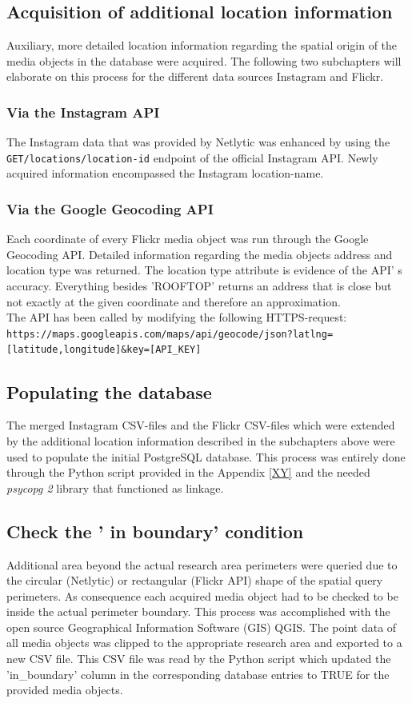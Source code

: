 \subsection{Acquisition of additional location information} \label{add_location_data}
Auxiliary, more detailed location information regarding the spatial origin of the media objects in the database were acquired. The following two subchapters will elaborate on this process for the different data sources Instagram and Flickr.

\subsubsection{Via the Instagram API}
The Instagram data that was provided by Netlytic was enhanced by using the \texttt{GET/locations/location-id} endpoint of the official Instagram API. Newly acquired information encompassed the Instagram location-name.

\subsubsection{Via the Google Geocoding API}
Each coordinate of every Flickr media object was run through the Google Geocoding API. Detailed information regarding the media objects address and location type was returned. The location type attribute is evidence of the API' s accuracy. Everything besides 'ROOFTOP' returns an address that is close but not exactly at the given coordinate and therefore an approximation.\\
The API has been called by modifying the following HTTPS-request:\\
\texttt{https://maps.googleapis.com/maps/api/geocode/json?latlng=[latitude,longitude]&key=[API\_KEY]}

\subsection{Populating the database} \label{populate_db}
The merged Instagram CSV-files and the Flickr CSV-files which were extended by the additional location information described in the subchapters above were used to populate the initial PostgreSQL database. This process was entirely done through the Python script provided in the Appendix \ref{XY} and the needed \textit{psycopg 2} library that functioned as linkage.

\subsection{Check the ' in boundary' condition} \label{in_boundary}
Additional area beyond the actual research area perimeters were queried due to the circular (Netlytic) or rectangular (Flickr API) shape of the spatial query perimeters. As consequence each acquired media object had to be checked to be inside the actual perimeter boundary. This process was accomplished with the open source Geographical Information Software (GIS) QGIS. The point data of all media objects was clipped to the appropriate research area and exported to a new CSV file. This CSV file was read by the Python script which updated the 'in\_boundary' column in the corresponding database entries to TRUE for the provided media objects.

